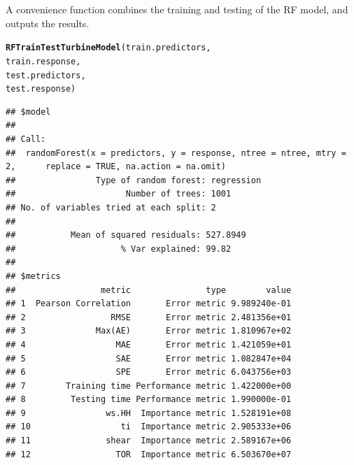 \documentclass[nojss]{jss}\usepackage[]{graphicx}\usepackage[]{color}
\makeatletter
\newcommand{\hlstd}[1]{\textcolor[rgb]{0.345,0.345,0.345}{#1}}%
\newcommand{\hlkwd}[1]{\textcolor[rgb]{0.737,0.353,0.396}{\textbf{#1}}}%
\newenvironment{kframe}{%
 \def\at@end@of@kframe{}%
 \ifinner\ifhmode%
  \def\at@end@of@kframe{\end{minipage}}%
  \begin{minipage}{\columnwidth}%
 \fi\fi%
 \def\FrameCommand##1{\hskip\@totalleftmargin \hskip-\fboxsep
 \colorbox{shadecolor}{##1}\hskip-\fboxsep
     \hskip-\linewidth \hskip-\@totalleftmargin \hskip\columnwidth}%
 \MakeFramed {\advance\hsize-\width
   \@totalleftmargin\z@ \linewidth\hsize
   \@setminipage}}%
 {\par\unskip\endMakeFramed%
 \at@end@of@kframe}
\newenvironment{knitrout}{}{} %
\makeatother
\begin{document}
A convenience function  combines the training and testing of the RF model, and outputs the results.

\begin{knitrout}
\color{fgcolor}\begin{kframe}
\begin{alltt}
\hlkwd{RFTrainTestTurbineModel}\hlstd{(train.predictors,}
                        \hlstd{train.response,}
                        \hlstd{test.predictors,}
                        \hlstd{test.response)}
\end{alltt}
\begin{verbatim}
## $model
## 
## Call:
##  randomForest(x = predictors, y = response, ntree = ntree, mtry = 2,      replace = TRUE, na.action = na.omit) 
##                Type of random forest: regression
##                      Number of trees: 1001
## No. of variables tried at each split: 2
## 
##           Mean of squared residuals: 527.8949
##                     % Var explained: 99.82
## 
## $metrics
##                 metric               type        value
## 1  Pearson Correlation       Error metric 9.989240e-01
## 2                 RMSE       Error metric 2.481356e+01
## 3              Max(AE)       Error metric 1.810967e+02
## 4                  MAE       Error metric 1.421059e+01
## 5                  SAE       Error metric 1.082847e+04
## 6                  SPE       Error metric 6.043756e+03
## 7        Training time Performance metric 1.422000e+00
## 8         Testing time Performance metric 1.990000e-01
## 9                ws.HH  Importance metric 1.528191e+08
## 10                  ti  Importance metric 2.905333e+06
## 11               shear  Importance metric 2.589167e+06
## 12                 TOR  Importance metric 6.503670e+07
\end{verbatim}
\end{kframe}
\end{knitrout}
\end{document}
